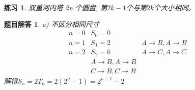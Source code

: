 \documentclass[mode=geye]{elegantnote}
\newtheorem{exercise}{练习}
\newtheorem{answer}{题目解答}
\begin{document}
\begin{exercise}
	双重河内塔 2n 个圆盘, 第$ 2k-1 $个与第$ 2k $个大小相同。
\end{exercise}

\begin{answer}
	a) 不区分相同尺寸
	\begin{equation*}
		\begin{aligned}
			n=0 & S_0=0	& \\
			n=1 & S_1=2	& A \rightarrow B, A \rightarrow B\\
			n=2 & S_2=6	& A \rightarrow C, A \rightarrow C\\
						& A \rightarrow B, A \rightarrow B\\
						& C \rightarrow B, C \rightarrow B
		\end{aligned}
	\end{equation*}
	解得$ S_n = 2T_n = 2(2^n-1)=2^{n+1}-2 $
	

\end{answer}
\end{document}
